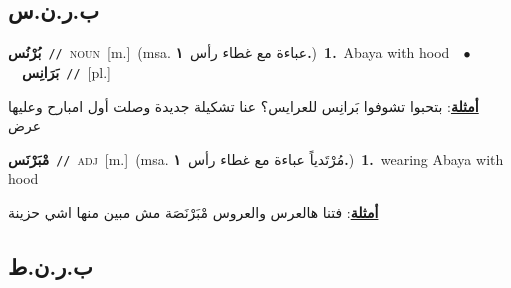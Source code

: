 \documentclass[10pt,a4paper,twoside]{article} %
\begin{document}
\begin{multicols}{2}
\vspace{-3mm}
\subsection*{\color{blue}\foreignlanguage{arabic}{ب.ر.ن.س}\color{blue}{ (ntws)}} 

{\setlength\topsep{0pt}\textbf{\foreignlanguage{arabic}{بُرْنُس}}\ {\color{gray}\texttt{//}\color{black}}\ \textsc{noun}\ [m.]\ \color{gray}(msa. \foreignlanguage{arabic}{عباءة مع غطاء رأس}~\foreignlanguage{arabic}{\textbf{١.}})\color{black}\ \textbf{1.}~Abaya with hood\ \ $\bullet$\ \ \setlength\topsep{0pt}\textbf{\foreignlanguage{arabic}{بَرَانِس}}\ {\color{gray}\texttt{//}\color{black}}\ [pl.]\  \begin{flushright}\color{gray}\foreignlanguage{arabic}{\textbf{\underline{\foreignlanguage{arabic}{أمثلة}}}: بتحبوا تشوفوا بَرانِس للعرايس؟ عنا تشكيلة جديدة وصلت أول امبارح وعليها عرض}\end{flushright}\color{black}} \vspace{2mm}

{\setlength\topsep{0pt}\textbf{\foreignlanguage{arabic}{مْبَرْنَس}}\ {\color{gray}\texttt{//}\color{black}}\ \textsc{adj}\ [m.]\ \color{gray}(msa. \foreignlanguage{arabic}{مُرْتَدياً عباءة مع غطاء رأس}~\foreignlanguage{arabic}{\textbf{١.}})\color{black}\ \textbf{1.}~wearing Abaya with hood\  \begin{flushright}\color{gray}\foreignlanguage{arabic}{\textbf{\underline{\foreignlanguage{arabic}{أمثلة}}}: فتنا هالعرس والعروس مْبَرْنَصَة مش مبين منها اشي حزينة}\end{flushright}\color{black}} \vspace{2mm}

\vspace{-3mm}
\subsection*{\color{blue}\foreignlanguage{arabic}{ب.ر.ن.ط}\color{blue}{}} 


\end{multicols}
\end{document}
